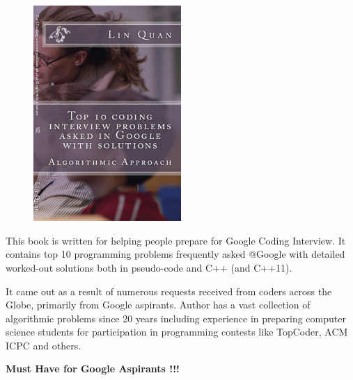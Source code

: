 \begin{figure}
  \begin{center}
    \includegraphics[width=0.5\textwidth]{top10/cover}
  \end{center}
\end{figure}

This book is written for helping people prepare for Google Coding Interview. It contains top 10 programming problems frequently asked @Google with detailed worked-out solutions both in pseudo-code and C++ (and C++11).

It came out as a result of numerous requests received from coders across the Globe, primarily from Google aspirants. Author has a vast collection of algorithmic problems since 20 years including experience in preparing computer science students for participation in programming contests like TopCoder, ACM ICPC and others.



\begin{center}
\textbf{Must Have for Google Aspirants !!!}
\end{center}


